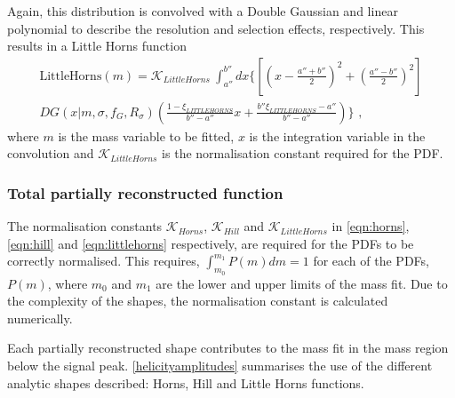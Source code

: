 Again, this distribution is convolved with a Double Gaussian and linear polynomial to describe the resolution and selection effects, respectively. This results in a Little Horns function
\begin{multline}
\text{LittleHorns}(m) = \mathcal{K}_{LittleHorns}\ \int_{a''}^{b''} dx \biggl\{ \left[ \left( x - \frac{a''+b''}{2} \right) ^2 + \left( \frac{a''-b''}{2} \right) ^2 \right] \\
 DG(x|m,\sigma,f_G,R_{\sigma}) \left( \frac{1 - \xi_{LITTLEHORNS}}{b'' - a''}x + \frac{b''\xi_{LITTLEHORNS} - a''}{b'' - a''} \right) \biggr\} \text{ ,}
\label{eqn:littlehorns}
\end{multline}
where $m$ is the mass variable to be fitted, $x$ is the integration variable in the convolution and $\mathcal{K}_{LittleHorns}$ is the normalisation constant required for the PDF.

\subsubsection{Total partially reconstructed function}

The normalisation constants $\mathcal{K}_{Horns}$, $\mathcal{K}_{Hill}$ and $\mathcal{K}_{LittleHorns}$ in \eqns\ref{eqn:horns}, \ref{eqn:hill} and \ref{eqn:littlehorns} respectively, are required for the PDFs to be correctly normalised. This requires, $\int_{m_0}^{m_1} P(m) dm = 1$ for each of the PDFs, $P(m)$, where $m_0$ and $m_1$ are the lower and upper limits of the mass fit. Due to the complexity of the shapes, the normalisation constant is calculated numerically. 

Each partially reconstructed shape contributes to the mass fit in the \Bm mass region below the signal peak. \Tab\ref{helicityamplitudes} summarises the use of the different analytic shapes described: Horns, Hill and Little Horns functions. 

